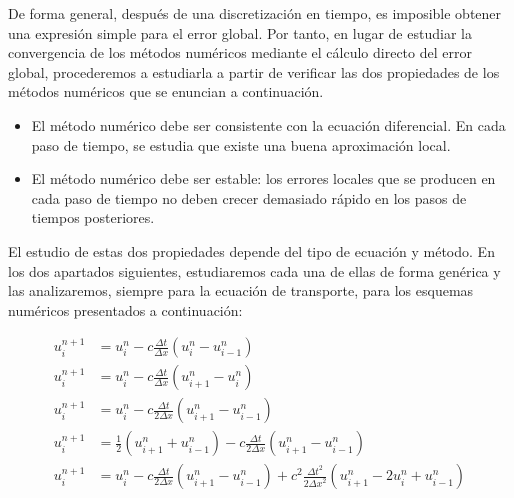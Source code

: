De forma general, después de una discretización en tiempo, es
imposible obtener una expresión simple para el error global.
Por tanto, en lugar de estudiar la convergencia de los métodos
numéricos mediante el cálculo directo del error global, procederemos
a estudiarla a partir de verificar las dos propiedades de los métodos
numéricos que se enuncian a continuación.

\begin{itemize}
  \item

        El método numérico debe ser consistente con la ecuación
        diferencial.
        En cada paso de tiempo, se estudia que existe una buena
        aproximación local.

  \item

        El método numérico debe ser estable: los errores locales
        que se producen en cada paso de tiempo no deben crecer
        demasiado rápido en los pasos de tiempos posteriores.
\end{itemize}


El estudio de estas dos propiedades depende del tipo de ecuación y
método.
En los dos apartados siguientes, estudiaremos cada una de ellas de
forma genérica y las analizaremos, siempre para la ecuación de
transporte, para los esquemas numéricos presentados a continuación:

\begin{align}
  u^{n+1}_{i} & =
  u^{n}_{i}-
  c\frac{\Delta t}{\Delta x}
  \left(
  u^{n}_{i}-
  u^{n}_{i-1}
  \right)\label{eq:upwindscheme}        \\
  u^{n+1}_{i} & =
  u^{n}_{i}-
  c\frac{\Delta t}{\Delta x}
  \left(
  u^{n}_{i+1}-
  u^{n}_{i}
  \right)\label{eq:downwindscheme}      \\
  u^{n+1}_{i} & =
  u^{n}_{i}-
  c\frac{\Delta t}{2\Delta x}
  \left(
  u^{n}_{i+1}-u^{n}_{i-1}
  \right)\label{eq:ftcsscheme}          \\
  u^{n+1}_{i} & =
  \frac{1}{2}
  \left(
  u^{n}_{i+1}+
  u^{n}_{i-1}
  \right)-
  c\frac{\Delta t}{2\Delta x}
  \left(
  u^{n}_{i+1}-
  u^{n}_{i-1}
  \right)\label{eq:laxfriedrichsscheme} \\
  u^{n+1}_{i} & =
  u^{n}_{i}-
  c\frac{\Delta t}{2\Delta x}
  \left(
  u^{n}_{i+1}-
  u^{n}_{i-1}
  \right)+
  c^{2}
  \frac{{\Delta t}^{2}}{2{\Delta x}^{2}}
  \left(
  u^{n}_{i+1}-
  2u^{n}_{i}+
  u^{n}_{i-1}
  \right)\label{eq:laxwendroffscheme}
\end{align}

